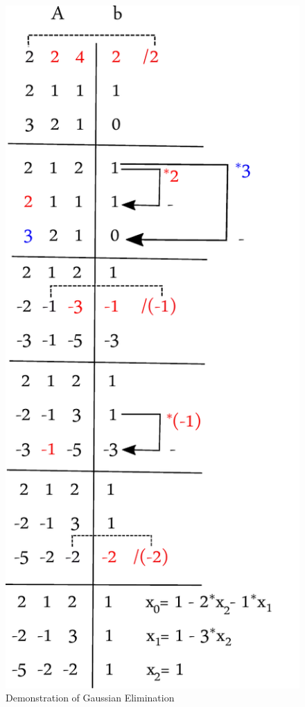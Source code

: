 \documentclass[11pt]{article}
\begin{document}
\begin{figure}[h]
  \begin{center}
    \includegraphics{graph.pdf}
    \caption{Demonstration of Gaussian Elimination}
    \label{graph}
  \end{center}
\end{figure}
\end{document}
